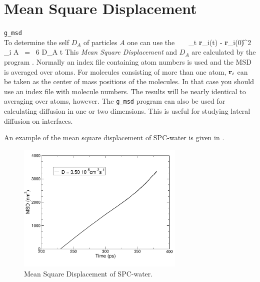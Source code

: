 \section{Mean Square Displacement}
\label{sec:msd}
{\tt g\_msd}\\
To determine the self  $D_A$ of
particles $A$ one can use the ~\cite{Allen87} \
\beq 
\lim_{t \rightarrow \infty} \langle
\|{\bf r}_i(t) - {\bf r}_i(0)\|^2 \rangle_{i \in A} ~=~ 6 D_A t 
\eeq
This {\em Mean Square Displacement} and $D_A$ are calculated by the
program {\tt \normindex{g\_msd}}. Normally an index file containing
atom numbers is used and the MSD is averaged over atoms.  For
molecules consisting of more than one atom, ${\bf r}_i$ can be taken
as the center of mass positions of the molecules. In that case you
should use an index file with molecule numbers. The results will be
nearly identical to averaging over atoms, however. The {\tt g\_msd}
program can
also be used for calculating diffusion in one or two dimensions. This
is useful for studying lateral diffusion on interfaces.

An example of the mean square displacement of SPC-water is given in
\figref{msdwater}.

\begin{figure}
\centerline{
{\includegraphics[width=8cm]{plots/msdwater}}}
\caption{Mean Square Displacement of SPC-water.}
\label{fig:msdwater}
\end{figure}

